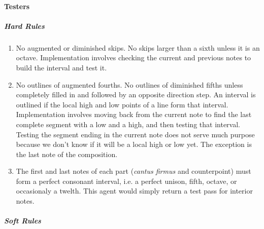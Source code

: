 \paragraph{Testers}
\subparagraph{Hard Rules}
	\begin{enumerate}
		\item No augmented or diminished skips. No skips larger than a sixth unless it is an octave.
					Implementation involves checking the current and previous notes to build the interval and test it.

		\item No outlines of augmented fourths. No outlines of diminished fifths unless completely filled in and followed by an opposite direction step.
					An interval is outlined if the local high and low points of a line form that interval.
					Implementation involves moving back from the current note to find the last complete segment with a low and a high, and then testing that interval.
					Testing the segment ending in the current note does not serve much purpose because we don't know if it will be a local high or low yet. The exception is the last note of the composition.

		\item The first and last notes of each part (\emph{cantus firmus} and counterpoint) must form a perfect consonant interval, i.e. a perfect unison, fifth, octave, or occasionaly a twelth.
					This agent would simply return a test pass for interior notes.

	\end{enumerate}
\subparagraph{Soft Rules}
